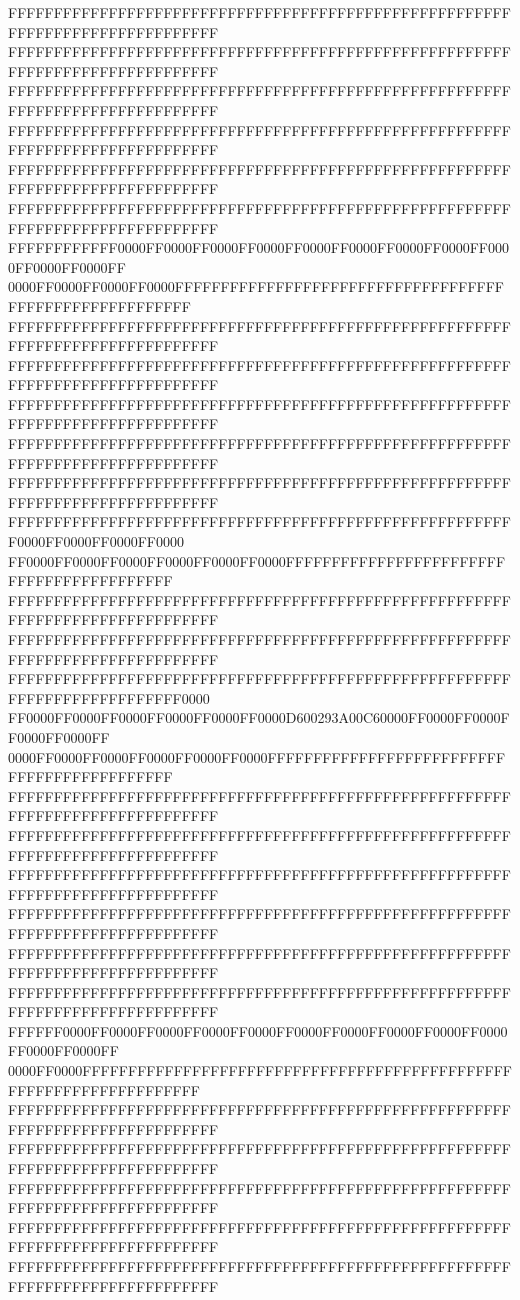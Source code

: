 FFFFFFFFFFFFFFFFFFFFFFFFFFFFFFFFFFFFFFFFFFFFFFFFFFFFFFFFFFFFFFFFFFFFFFFFFFFFFF
FFFFFFFFFFFFFFFFFFFFFFFFFFFFFFFFFFFFFFFFFFFFFFFFFFFFFFFFFFFFFFFFFFFFFFFFFFFFFF
FFFFFFFFFFFFFFFFFFFFFFFFFFFFFFFFFFFFFFFFFFFFFFFFFFFFFFFFFFFFFFFFFFFFFFFFFFFFFF
FFFFFFFFFFFFFFFFFFFFFFFFFFFFFFFFFFFFFFFFFFFFFFFFFFFFFFFFFFFFFFFFFFFFFFFFFFFFFF
FFFFFFFFFFFFFFFFFFFFFFFFFFFFFFFFFFFFFFFFFFFFFFFFFFFFFFFFFFFFFFFFFFFFFFFFFFFFFF
FFFFFFFFFFFFFFFFFFFFFFFFFFFFFFFFFFFFFFFFFFFFFFFFFFFFFFFFFFFFFFFFFFFFFFFFFFFFFF
FFFFFFFFFFFF0000FF0000FF0000FF0000FF0000FF0000FF0000FF0000FF0000FF0000FF0000FF
0000FF0000FF0000FF0000FFFFFFFFFFFFFFFFFFFFFFFFFFFFFFFFFFFFFFFFFFFFFFFFFFFFFFFF
FFFFFFFFFFFFFFFFFFFFFFFFFFFFFFFFFFFFFFFFFFFFFFFFFFFFFFFFFFFFFFFFFFFFFFFFFFFFFF
FFFFFFFFFFFFFFFFFFFFFFFFFFFFFFFFFFFFFFFFFFFFFFFFFFFFFFFFFFFFFFFFFFFFFFFFFFFFFF
FFFFFFFFFFFFFFFFFFFFFFFFFFFFFFFFFFFFFFFFFFFFFFFFFFFFFFFFFFFFFFFFFFFFFFFFFFFFFF
FFFFFFFFFFFFFFFFFFFFFFFFFFFFFFFFFFFFFFFFFFFFFFFFFFFFFFFFFFFFFFFFFFFFFFFFFFFFFF
FFFFFFFFFFFFFFFFFFFFFFFFFFFFFFFFFFFFFFFFFFFFFFFFFFFFFFFFFFFFFFFFFFFFFFFFFFFFFF
FFFFFFFFFFFFFFFFFFFFFFFFFFFFFFFFFFFFFFFFFFFFFFFFFFFFFFFF0000FF0000FF0000FF0000
FF0000FF0000FF0000FF0000FF0000FF0000FFFFFFFFFFFFFFFFFFFFFFFFFFFFFFFFFFFFFFFFFF
FFFFFFFFFFFFFFFFFFFFFFFFFFFFFFFFFFFFFFFFFFFFFFFFFFFFFFFFFFFFFFFFFFFFFFFFFFFFFF
FFFFFFFFFFFFFFFFFFFFFFFFFFFFFFFFFFFFFFFFFFFFFFFFFFFFFFFFFFFFFFFFFFFFFFFFFFFFFF
FFFFFFFFFFFFFFFFFFFFFFFFFFFFFFFFFFFFFFFFFFFFFFFFFFFFFFFFFFFFFFFFFFFFFFFFFF0000
FF0000FF0000FF0000FF0000FF0000FF0000D600293A00C60000FF0000FF0000FF0000FF0000FF
0000FF0000FF0000FF0000FF0000FF0000FFFFFFFFFFFFFFFFFFFFFFFFFFFFFFFFFFFFFFFFFFFF
FFFFFFFFFFFFFFFFFFFFFFFFFFFFFFFFFFFFFFFFFFFFFFFFFFFFFFFFFFFFFFFFFFFFFFFFFFFFFF
FFFFFFFFFFFFFFFFFFFFFFFFFFFFFFFFFFFFFFFFFFFFFFFFFFFFFFFFFFFFFFFFFFFFFFFFFFFFFF
FFFFFFFFFFFFFFFFFFFFFFFFFFFFFFFFFFFFFFFFFFFFFFFFFFFFFFFFFFFFFFFFFFFFFFFFFFFFFF
FFFFFFFFFFFFFFFFFFFFFFFFFFFFFFFFFFFFFFFFFFFFFFFFFFFFFFFFFFFFFFFFFFFFFFFFFFFFFF
FFFFFFFFFFFFFFFFFFFFFFFFFFFFFFFFFFFFFFFFFFFFFFFFFFFFFFFFFFFFFFFFFFFFFFFFFFFFFF
FFFFFFFFFFFFFFFFFFFFFFFFFFFFFFFFFFFFFFFFFFFFFFFFFFFFFFFFFFFFFFFFFFFFFFFFFFFFFF
FFFFFF0000FF0000FF0000FF0000FF0000FF0000FF0000FF0000FF0000FF0000FF0000FF0000FF
0000FF0000FFFFFFFFFFFFFFFFFFFFFFFFFFFFFFFFFFFFFFFFFFFFFFFFFFFFFFFFFFFFFFFFFFFF
FFFFFFFFFFFFFFFFFFFFFFFFFFFFFFFFFFFFFFFFFFFFFFFFFFFFFFFFFFFFFFFFFFFFFFFFFFFFFF
FFFFFFFFFFFFFFFFFFFFFFFFFFFFFFFFFFFFFFFFFFFFFFFFFFFFFFFFFFFFFFFFFFFFFFFFFFFFFF
FFFFFFFFFFFFFFFFFFFFFFFFFFFFFFFFFFFFFFFFFFFFFFFFFFFFFFFFFFFFFFFFFFFFFFFFFFFFFF
FFFFFFFFFFFFFFFFFFFFFFFFFFFFFFFFFFFFFFFFFFFFFFFFFFFFFFFFFFFFFFFFFFFFFFFFFFFFFF
FFFFFFFFFFFFFFFFFFFFFFFFFFFFFFFFFFFFFFFFFFFFFFFFFFFFFFFFFFFFFFFFFFFFFFFFFFFFFF
